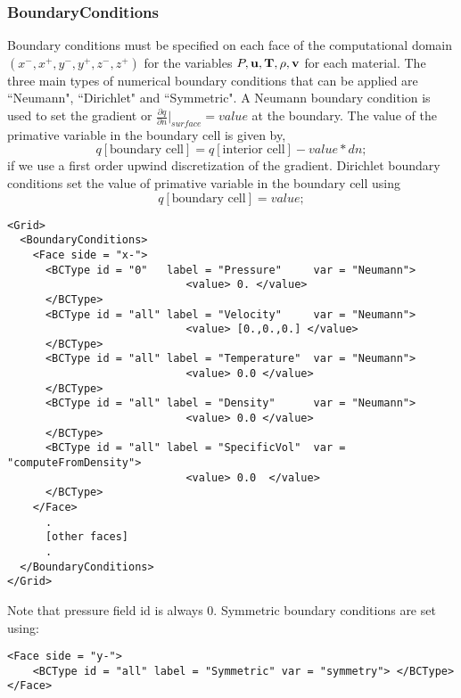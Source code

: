 \subsubsection{BoundaryConditions}
Boundary conditions must be specified on each face of the computational
domain $(x^-, x^+, y^-, y^+,z^-,z^+)$ for the variables $P, \bf{u}, T, \rho, v$ for
each material.  The three main types of numerical boundary conditions that can
be applied are ``Neumann",  ``Dirichlet" and ``Symmetric".  A Neumann boundary condition
is used to set the gradient or $\frac{\partial{q}}{\partial{n}}|_{surface} =
value$ at the boundary.   The value of the primative variable in the boundary
cell is given by,
%
\begin{equation}
    q[\text{boundary cell}] = q[\text{interior cell}] - value * dn;
\end{equation}
%
if we use a first order upwind discretization of the gradient.  Dirichlet boundary conditions set the value of primative variable in the boundary cell using
%
\begin{equation}
    q[\text{boundary cell}] =  value;
\end{equation}
%
\begin{Verbatim}[fontsize=\footnotesize]
<Grid>
  <BoundaryConditions>
    <Face side = "x-">
      <BCType id = "0"   label = "Pressure"     var = "Neumann">
                            <value> 0. </value>
      </BCType>
      <BCType id = "all" label = "Velocity"     var = "Neumann">
                            <value> [0.,0.,0.] </value>
      </BCType>
      <BCType id = "all" label = "Temperature"  var = "Neumann">
                            <value> 0.0 </value>
      </BCType>
      <BCType id = "all" label = "Density"      var = "Neumann">
                            <value> 0.0 </value>
      </BCType>
      <BCType id = "all" label = "SpecificVol"  var = "computeFromDensity">
                            <value> 0.0  </value>
      </BCType>
    </Face>
      .
      [other faces]
      .
  </BoundaryConditions>
</Grid>
\end{Verbatim}
Note that pressure field id is always 0. 
%
%
Symmetric boundary conditions are set using:
\begin{Verbatim}[fontsize=\footnotesize]
<Face side = "y-">
    <BCType id = "all" label = "Symmetric" var = "symmetry"> </BCType>
</Face>
\end{Verbatim}
%
